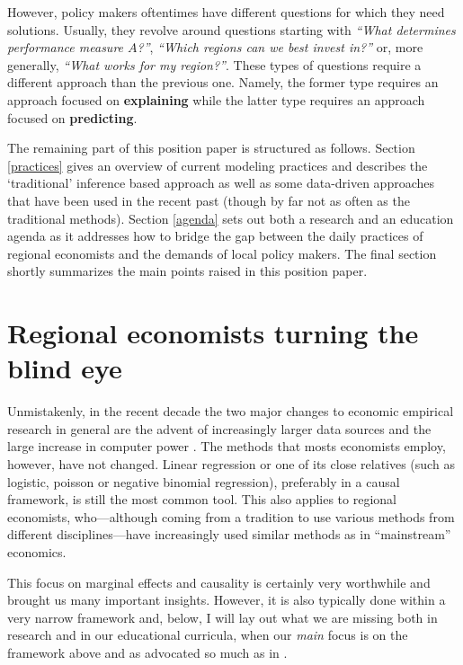 \documentclass[fleqn,10pt]{SelfArx} %
\begin{document}
However, policy makers oftentimes have different questions for which they need
solutions. Usually, they revolve around questions starting with \textit{``What
  determines performance measure $A$?''}, \textit{``Which regions can we best
    invest in?''} or, more generally, \textit{``What
  works for my region?''}. These types of questions require a different approach
than the previous one. Namely, the former type requires an approach focused on \textbf{explaining} while the latter type requires an approach focused on \textbf{predicting}.

The remaining part of this position paper is structured as follows. Section
\ref{practices} gives an overview of current modeling practices and describes the `traditional'
inference based approach as well as some data-driven approaches that have been
used in the recent past (though by far not as often as the traditional methods).
Section \ref{agenda} sets out both a research and an education agenda as it
addresses how to bridge the gap between the daily practices of regional
economists and the demands of local policy makers. The final section shortly
summarizes the main points raised in this position paper.  


\section{Regional economists turning the blind eye\label{practices}}

Unmistakenly, in the recent decade the two major changes to economic empirical research in general
are the advent of increasingly larger data sources and the large increase in
computer power \citep[]{einav2014economics}. The methods that mosts economists
employ, however, have not changed. Linear regression or one of its close
relatives (such as logistic, poisson or negative binomial regression), preferably in a causal
framework, is still the most common tool. This also applies to regional
economists, who---although coming from a tradition to use various methods from
different disciplines---have increasingly used similar methods as in
``mainstream'' economics.

This focus on marginal effects and causality is
certainly very worthwhile and brought us many important insights. However, it is
also typically done within a very narrow framework and, below, I will lay out what we are missing both in
research and in our educational curricula, when our \emph{main} focus is on the
framework above and as advocated so much as in \citet{angrist2008mostly}.   
\end{document}
